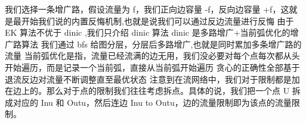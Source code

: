 {}我们选择一条增广路，假设流量为 \markdownRendererDollarSign{}f\markdownRendererDollarSign{}，我们正向边容量 \markdownRendererDollarSign{}-f\markdownRendererDollarSign{}，反向边容量 \markdownRendererDollarSign{}+f\markdownRendererDollarSign{}，这就是最开始我们说的内置反悔机制,也就是说我们可以通过反边流量进行反悔\markdownRendererParagraphSeparator
{}由于\markdownRendererDollarSign{} EK \markdownRendererDollarSign{}算法不优于\markdownRendererDollarSign{} dinic \markdownRendererDollarSign{},我们只介绍\markdownRendererDollarSign{} dinic \markdownRendererDollarSign{}算法\markdownRendererParagraphSeparator
{}\markdownRendererDollarSign{} dinic \markdownRendererDollarSign{}是多路增广+当前弧优化的增广路算法\markdownRendererParagraphSeparator
{}我们通过\markdownRendererDollarSign{} bfs \markdownRendererDollarSign{}给图分层，分层后多路增广,也就是同时累加多条增广路的流量\markdownRendererParagraphSeparator
{}当前弧优化是指，流量已经流满的边无用，我们没必要对每个点每次都从头开始遍历，而是记录一个当前弧，直接从当前弧开始遍历\markdownRendererParagraphSeparator
{}贪心的正确性全部基于退流反边对流量不断调整直至最优状态\markdownRendererInterblockSeparator
{}\markdownRendererSectionBegin
{}\markdownRendererInterblockSeparator
{}注意到在流网络中，我们对于限制都是加在边上的。那么对于点的限制我们往往考虑拆点。具体的说，我们把一个点 \markdownRendererDollarSign{}U\markdownRendererDollarSign{} 拆成对应的 \markdownRendererDollarSign{}In\markdownRendererUnderscore{}u\markdownRendererDollarSign{} 和 \markdownRendererDollarSign{}Out\markdownRendererUnderscore{}u\markdownRendererDollarSign{}，然后连边 \markdownRendererDollarSign{}In\markdownRendererUnderscore{}u \markdownRendererBackslash{}to Out\markdownRendererUnderscore{}u\markdownRendererDollarSign{}，边的流量限制即为该点的流量限制。\markdownRendererInterblockSeparator
{}
\markdownRendererSectionEnd \markdownRendererSectionBegin
{}\markdownRendererInterblockSeparator
{}\markdownRendererInterblockSeparator
{}
\markdownRendererSectionEnd \markdownRendererSectionBegin
{}\markdownRendererInterblockSeparator
{}\markdownRendererSectionBegin
{}\markdownRendererInterblockSeparator
{}\markdownRendererInterblockSeparator
{}
\markdownRendererSectionEnd \markdownRendererSectionBegin
